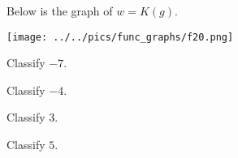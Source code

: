 \documentclass{ximera}
\author{Lee Wayand}
\begin{document}
\begin{exercise}  





Below is the graph of $w=K(g)$.  

\begin{image}
\texttt{[image: ../../pics/func\_graphs/f20.png]}
\end{image}









\begin{question} 


Classify $-7$. \\


\begin{multipleChoice}
\end{multipleChoice}

\end{question}






\begin{question} 


Classify $-4$. \\


\begin{multipleChoice}
\end{multipleChoice}




Classify $3$. \\


\begin{multipleChoice}
\end{multipleChoice}




Classify $5$. \\


\begin{multipleChoice}
\end{multipleChoice}

\end{question}







\end{exercise}
\end{document}

